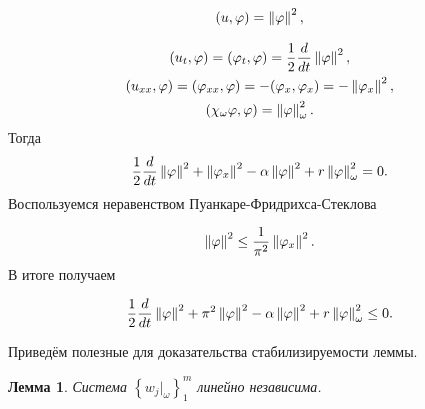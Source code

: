 \begin{gather*}
    (u, \varphi) = \left\lVert\varphi\right\rVert^2, \\*
\end{gather*}

\begin{gather*}
    (u_t, \varphi) = (\varphi_t, \varphi) = \frac{1}{2} \frac{d}{dt}
    \left\lVert\varphi\right\rVert^2, \\*
    (u_{xx}, \varphi) = (\varphi_{xx}, \varphi) = -(\varphi_x, \varphi_x) = -
    \left\lVert\varphi_x\right\rVert^2, \\*
    (\chi_{\omega}\varphi, \varphi) = \left\lVert\varphi\right\rVert^2_{\omega}.
\end{gather*}
Тогда
\begin{equation*}
    \frac{1}{2} \frac{d}{dt} \left\lVert\varphi\right\rVert^2  + \left\lVert\varphi_x\right\rVert^2 - 
    \alpha \left\lVert\varphi\right\rVert^2 + r \left\lVert\varphi\right\rVert^2_{\omega} = 0.
\end{equation*}
Воспользуемся неравенством Пуанкаре-Фридрихса-Стеклова

\begin{equation}
    \left\lVert\varphi\right\rVert^2 \le \frac{1}{\pi^2} \left\lVert\varphi_x\right\rVert^2.
\end{equation}
В итоге получаем

\begin{equation}
    \frac{1}{2} \frac{d}{dt} \left\lVert\varphi\right\rVert^2 + \pi^2 \left\lVert\varphi\right\rVert^2 - 
    \alpha \left\lVert\varphi\right\rVert^2 + r \left\lVert\varphi\right\rVert^2_{\omega} \le 0.
\end{equation}

Приведём полезные для доказательства стабилизируемости леммы.

\newtheorem{lemma}{Лемма}

\begin{lemma}\label{util_lemma}
    Система $\left\{ w_j|_{\omega} \right\}^m_1$ линейно независима.
\end{lemma}

